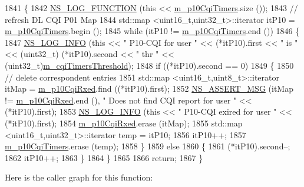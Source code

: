 \begin{DoxyCode}
1841 \{
1842   \hyperlink{log-macros-disabled_8h_a90b90d5bad1f39cb1b64923ea94c0761}{NS\_LOG\_FUNCTION} (\textcolor{keyword}{this} << \hyperlink{classns3_1_1RrFfMacScheduler_a1c5527d9b000ec9f4998595b47d54ad2}{m\_p10CqiTimers}.size ());
1843   \textcolor{comment}{// refresh DL CQI P01 Map}
1844   std::map <uint16\_t,uint32\_t>::iterator itP10 = \hyperlink{classns3_1_1RrFfMacScheduler_a1c5527d9b000ec9f4998595b47d54ad2}{m\_p10CqiTimers}.begin ();
1845   \textcolor{keywordflow}{while} (itP10 != \hyperlink{classns3_1_1RrFfMacScheduler_a1c5527d9b000ec9f4998595b47d54ad2}{m\_p10CqiTimers}.end ())
1846     \{
1847       \hyperlink{group__logging_gafbd73ee2cf9f26b319f49086d8e860fb}{NS\_LOG\_INFO} (\textcolor{keyword}{this} << \textcolor{stringliteral}{" P10-CQI for user "} << (*itP10).first << \textcolor{stringliteral}{" is "} << (uint32\_t)
      (*itP10).second << \textcolor{stringliteral}{" thr "} << (uint32\_t)\hyperlink{classns3_1_1RrFfMacScheduler_a51ae1963d7d95e89917af4c603f08a91}{m\_cqiTimersThreshold});
1848       \textcolor{keywordflow}{if} ((*itP10).second == 0)
1849         \{
1850           \textcolor{comment}{// delete correspondent entries}
1851           std::map <uint16\_t,uint8\_t>::iterator itMap = \hyperlink{classns3_1_1RrFfMacScheduler_aabdb8d68324faae8a279df6378d589b7}{m\_p10CqiRxed}.find ((*itP10).first);
1852           \hyperlink{assert_8h_aff5ece9066c74e681e74999856f08539}{NS\_ASSERT\_MSG} (itMap != \hyperlink{classns3_1_1RrFfMacScheduler_aabdb8d68324faae8a279df6378d589b7}{m\_p10CqiRxed}.end (), \textcolor{stringliteral}{" Does not find CQI report
       for user "} << (*itP10).first);
1853           \hyperlink{group__logging_gafbd73ee2cf9f26b319f49086d8e860fb}{NS\_LOG\_INFO} (\textcolor{keyword}{this} << \textcolor{stringliteral}{" P10-CQI exired for user "} << (*itP10).first);
1854           \hyperlink{classns3_1_1RrFfMacScheduler_aabdb8d68324faae8a279df6378d589b7}{m\_p10CqiRxed}.erase (itMap);
1855           std::map <uint16\_t,uint32\_t>::iterator temp = itP10;
1856           itP10++;
1857           \hyperlink{classns3_1_1RrFfMacScheduler_a1c5527d9b000ec9f4998595b47d54ad2}{m\_p10CqiTimers}.erase (temp);
1858         \}
1859       \textcolor{keywordflow}{else}
1860         \{
1861           (*itP10).second--;
1862           itP10++;
1863         \}
1864     \}
1865 
1866   \textcolor{keywordflow}{return};
1867 \}
\end{DoxyCode}


Here is the caller graph for this function\+:


